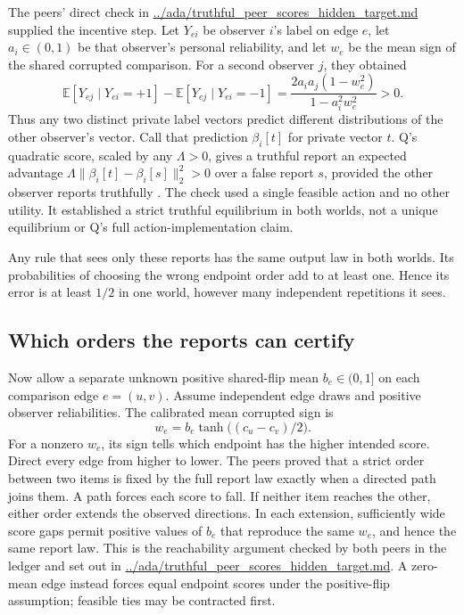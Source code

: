 \documentclass{article}
\begin{document}
The peers' direct check in \url{../ada/truthful_peer_scores_hidden_target.md} supplied the incentive step. Let
\(Y_{ei}\) be observer \(i\)'s label on edge \(e\), let \(a_i\in(0,1)\) be that observer's personal
reliability, and let \(w_e\) be the mean sign of the shared corrupted comparison. For a second observer \(j\),
they obtained
\[
\mathbb E[Y_{ej}\mid Y_{ei}=+1]
-\mathbb E[Y_{ej}\mid Y_{ei}=-1]
=\frac{2a_i a_j(1-w_e^2)}{1-a_i^2w_e^2}>0.
\]
Thus any two distinct private label vectors predict different distributions of the other observer's vector.
Call that prediction \(\beta_i[t]\) for private vector \(t\). Q's quadratic score, scaled by any
\(\Lambda>0\), gives a truthful report an expected advantage \(\Lambda\|\beta_i[t]-\beta_i[s]\|_2^2>0\) over a
false report \(s\), provided the other observer reports truthfully \cite{Q}. The check used a single feasible
action and no other utility. It established a strict truthful equilibrium in both worlds, not a unique
equilibrium or Q's full action-implementation claim.

Any rule that sees only these reports has the same output law in both worlds. Its probabilities of choosing
the wrong endpoint order add to at least one. Hence its error is at least \(1/2\) in one world, however many
independent repetitions it sees.

\subsection{Which orders the reports can certify}

Now allow a separate unknown positive shared-flip mean \(b_e\in(0,1]\) on each comparison edge \(e=(u,v)\).
Assume independent edge draws and positive observer reliabilities. The calibrated mean corrupted sign is
\[
w_e=b_e\tanh\bigl((c_u-c_v)/2\bigr).
\]
For a nonzero \(w_e\), its sign tells which endpoint has the higher intended score. Direct every edge from
higher to lower. The peers proved that a strict order between two items is fixed by the full report law
exactly when a directed path joins them. A path forces each score to fall. If neither item reaches the other,
either order extends the observed directions. In each extension, sufficiently wide score gaps permit positive
values of \(b_e\) that reproduce the same \(w_e\), and hence the same report law. This is the reachability
argument checked by both peers in the ledger and set out in
\url{../ada/truthful_peer_scores_hidden_target.md}. A zero-mean edge instead forces equal endpoint scores
under the positive-flip assumption; feasible ties may be contracted first.
\end{document}
